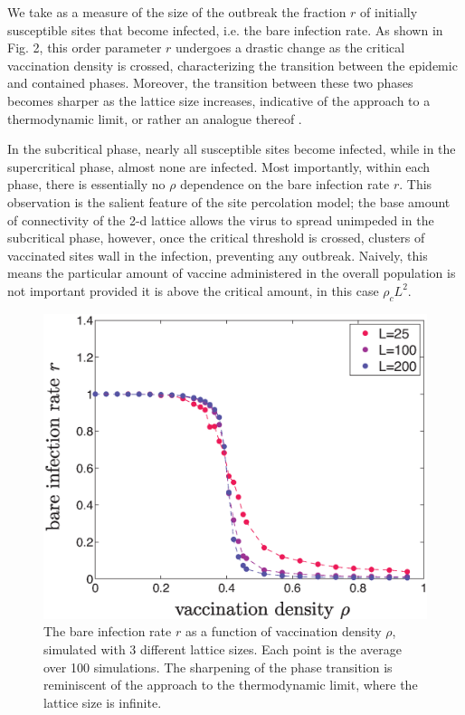 \documentclass{article}
\begin{document}
We take as a measure of the size of the outbreak the fraction $r$ of initially susceptible sites that become infected,
i.e. the bare infection rate. As shown in Fig. 2, this order parameter $r$ undergoes a drastic change as the critical vaccination density is crossed, characterizing the transition between the epidemic and contained phases. Moreover, the transition between these two phases becomes sharper as the lattice size increases, indicative of the approach to a thermodynamic limit, or rather an analogue thereof \cite{Goldenfeld}. 

In the subcritical phase, nearly all susceptible sites become infected, while in the supercritical phase, almost none are infected. Most importantly, within each phase, there is essentially no $\rho$ dependence on the bare infection rate $r$. This observation is the salient feature of the site percolation model; the base amount of connectivity of the 2-d lattice allows the virus to spread unimpeded in the subcritical phase, however, once the critical threshold is crossed, clusters of vaccinated sites wall in the infection, preventing any outbreak. Naively, this means the particular amount of vaccine administered in the overall population is not important provided it is above the critical amount, in this case $\rho_{c}L^{2}$.

\begin{figure}[H]
\centering
\includegraphics[scale=0.4]{figs/thermo_lim.eps}
\caption{The bare infection rate $r$ as a function of vaccination density $\rho$, simulated with 3 different lattice sizes. Each point is the average over 100 simulations. The sharpening of the phase transition is reminiscent of the approach to the thermodynamic limit, where the lattice size is infinite.}
\label{fig:Thermodynamic Limit}
\end{figure}
\end{document}
